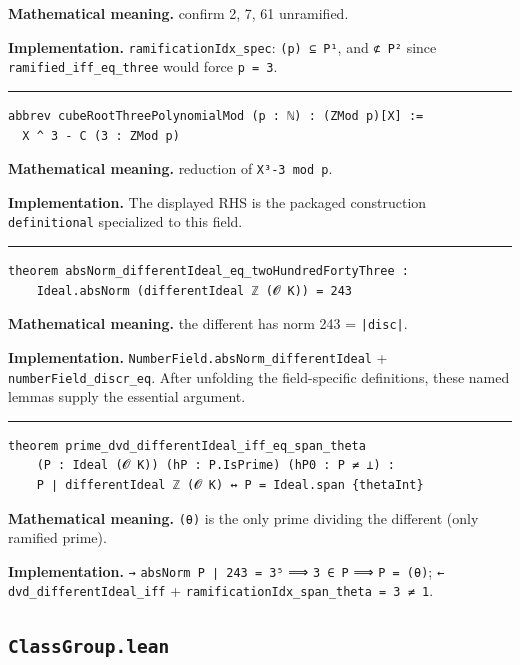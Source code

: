 \documentclass[UTF8,a4paper,11pt,fontset=fandol]{ctexart}
\theoremstyle{definition}
\newcommand{\statementsep}{\par\medskip\hrule\medskip}
\begin{document}
\noindent\textbf{Mathematical meaning.} confirm 2, 7, 61 unramified.\par
\noindent\textbf{Implementation.} \texttt{ramificationIdx\_\allowbreak{}spec}: \texttt{(p) ⊆ P¹}, and \texttt{⊄ P²} since \texttt{ramified\_\allowbreak{}iff\_\allowbreak{}eq\_\allowbreak{}three} would force \texttt{p = 3}.\par
\statementsep
\begin{verbatim}
abbrev cubeRootThreePolynomialMod (p : ℕ) : (ZMod p)[X] :=
  X ^ 3 - C (3 : ZMod p)
\end{verbatim}
\noindent\textbf{Mathematical meaning.} reduction of \texttt{X³-3 mod p}.\par
\noindent\textbf{Implementation.} The displayed RHS is the packaged construction \texttt{definitional} specialized to this field.\par
\statementsep
\begin{verbatim}
theorem absNorm_differentIdeal_eq_twoHundredFortyThree :
    Ideal.absNorm (differentIdeal ℤ (𝓞 K)) = 243
\end{verbatim}
\noindent\textbf{Mathematical meaning.} the different has norm 243 = \texttt{|disc|}.\par
\noindent\textbf{Implementation.} \texttt{NumberField.\allowbreak{}absNorm\_\allowbreak{}differentIdeal} + \texttt{numberField\_\allowbreak{}discr\_\allowbreak{}eq}. After unfolding the field-specific definitions, these named lemmas supply the essential argument.\par
\statementsep
\begin{verbatim}
theorem prime_dvd_differentIdeal_iff_eq_span_theta
    (P : Ideal (𝓞 K)) (hP : P.IsPrime) (hP0 : P ≠ ⊥) :
    P ∣ differentIdeal ℤ (𝓞 K) ↔ P = Ideal.span {thetaInt}
\end{verbatim}
\noindent\textbf{Mathematical meaning.} \texttt{(θ)} is the only prime dividing the different (only ramified prime).\par
\noindent\textbf{Implementation.} \texttt{→} \texttt{absNorm P ∣ 243 = 3⁵} ⟹ \texttt{3 ∈ P} ⟹ \texttt{P = (θ)}; \texttt{←} \texttt{dvd\_\allowbreak{}differentIdeal\_\allowbreak{}iff} + \texttt{ramificationIdx\_\allowbreak{}span\_\allowbreak{}theta = 3 ≠ 1}.\par

\subsection{\texttt{ClassGroup.lean}}
\end{document}
